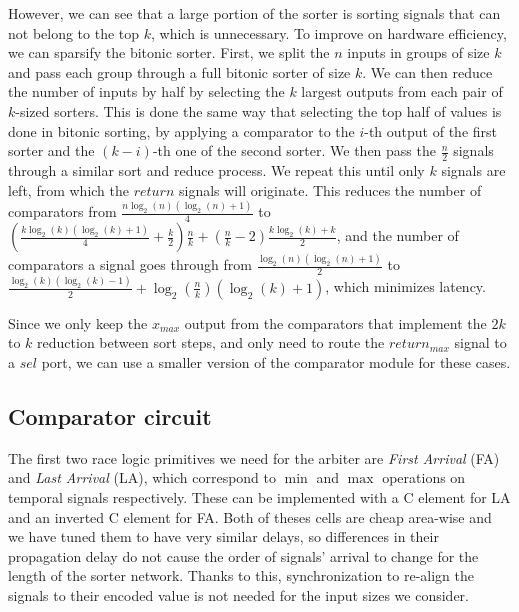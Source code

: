 \documentclass[conference]{IEEEtran}
\begin{document}
However, we can see that a large portion of the sorter is
sorting signals that can not belong to the top $k$, which is
unnecessary. To improve on hardware efficiency, we can
sparsify the bitonic sorter. First, we split the $n$ inputs
in groups of size $k$ and pass each group through a full
bitonic sorter of size $k$.
We can then reduce the number of inputs by half by
selecting the $k$ largest outputs from each pair of
$k$-sized sorters. This is done the same way that selecting
the top half of values is done in bitonic sorting, by
applying a comparator to the $i$-th output of the first
sorter and the $(k-i)$-th one of the second sorter. We then
pass the $\frac{n}{2}$ signals through a similar sort and
reduce process. We repeat this until only $k$ signals are
left, from which the $return$ signals will originate. This
reduces the number of comparators from $\frac{n \log_2(n)
(\log_2(n)+1)}{4}$ to $(\frac{k \log_2(k) (\log_2(k)+1)}{4}
+\frac{k}{2}) \frac{n}{k}+(\frac{n}{k}-2)\frac{k \log_2(k) +
k}{2}$, and the number of comparators a signal goes through
from $\frac{\log_2(n) (\log_2(n)+1)}{2}$ to $\frac{\log_2(k)
(\log_2(k)-1)}{2} + \log_2(\frac{n}{k})(\log_2(k) + 1)$,
which minimizes latency.

Since we only keep the $x_{max}$ output from the comparators
that implement the $2k$ to $k$ reduction between sort steps,
and only need to route the $return_{max}$ signal to a $sel$
port, we can use a smaller version of the comparator module
for these cases.

\subsection{Comparator circuit}

The first two race logic primitives we need for the arbiter
are \textit{First Arrival} (FA) and \textit{Last Arrival}
(LA), which correspond to $\min$ and $\max$ operations on
temporal signals respectively. These can be implemented with
a C element for LA and an inverted C element for FA. Both of
theses cells are cheap area-wise and we have tuned them to
have very similar delays, so differences in their
propagation delay do not cause the order of signals' arrival
to change for the length of the sorter network. Thanks to
this, synchronization to re-align the signals to their
encoded value is not needed for the input sizes we consider.
\end{document}
